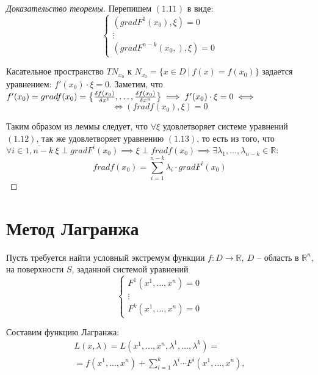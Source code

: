 \documentclass{report}
\theoremstyle{definition}
\begin{document}
\begin{proof}[Доказательство теоремы]
  Перепишем $(1.11)$ в виде:
  \begin{equation}
    \left\{\begin{array}{l}
      (grad F^1(x_0),\xi) = 0 \\
      \vdots                  \\
      (grad F^{n-k}(x_0,),\xi) = 0
    \end{array}\right.
  \end{equation}

  Касательное пространство $TN_{x_0}$ к $N_{x_0} = \{x \in D \ \big| \ f(x) = f(x_0)\}$ задается уравнением: $f'(x_0)\cdot\xi = 0$. Заметим, что $f'(x_0) = grad f(x_0) = \\ \big\{\frac{\delta f(x_0)}{\delta x^1},\ldots,\frac{\delta f(x_0)}{\delta x^n}\big\} \implies f'(x_0)\cdot \xi = 0 \iff$
  \begin{equation}
    \iff (frad f(x_0),\xi) = 0
  \end{equation}

  Таким образом из леммы следует, что $\forall \xi$ удовлетворяет системе уравнений $(1.12)$, так же удовлетворяет уравнению $(1.13)$, то есть из того, что $\forall i \in \overline{1,n-k} \ \xi \perp grad F^i(x_0) \implies \xi \perp frad f(x_0) \implies \exists \lambda_1,\ldots,\lambda_{n-k} \in \mathbb{R}:$
  \begin{equation*}
    frad f(x_0) = \sum_{i = 1}^{n-k} \lambda_i\cdot grad F^i(x_0)
  \end{equation*}
\end{proof}

\section*{Метод Лагранжа}

Пусть требуется найти условный экстремум функции $f:D\rightarrow\mathbb{R}, \ D$ -- область в $\mathbb{R}^n$, на поверхности $S$, заданной системой уравнений
\begin{equation*}
  \left\{\begin{array}{l}
    F^1(x^1,\ldots,x^n) = 0 \\
    \vdots                  \\
    F^k(x^1,\ldots,x^n) = 0
  \end{array}\right.
\end{equation*}

Составим функцию Лагранжа:
\begin{multline*}
  L(x,\lambda) = L(x^1,\ldots,x^n,\lambda^1,\ldots,\lambda^k) = \\
  = f(x^1,\ldots,x^n) + \sum_{i=1}^{k}\lambda^i\cdots F^i(x^1,\ldots,x^n),
\end{multline*}
\end{document}
